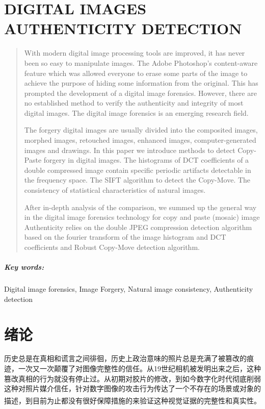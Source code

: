 \documentclass[a4paper, 10pt, notitlepage]{report}
\newcommand{\sihao}{\fontsize{14pt}{\baselineskip}\selectfont}
\newcommand{\wuhao}{\fontsize{10.5pt}{\baselineskip}\selectfont}
\newcommand{\supercite}[1]{\textsuperscript{\cite{#1}}}
\begin{document}
\chapter*{DIGITAL IMAGES AUTHENTICITY DETECTION}
	\thispagestyle{myheadings}
	\renewcommand{\abstractname}{\sihao ABSTRACT}
	\begin{abstract}
	\wuhao
	\vspace{20pt}
	With modern digital image processing tools are improved, it has never been so easy to manipulate images. The Adobe Photoshop's content-aware feature which was allowed everyone to erase some parts of the image to achieve the purpose of hiding some information from the original. This has prompted the development of a digital image forensics. However, there are no established method to verify the authenticity and integrity of most digital images. The digital image forensics is an emerging research field.

	The forgery digital images are usually divided into the composited images, morphed images, retouched images, enhanced images, computer-generated images and drawings. In this paper we introduce methods to detect Copy-Paste forgery in digital images. The histograms of DCT coefficients of a double compressed image contain specific periodic artifacts detectable in the frequency space. The SIFT algorithm to detect the Copy-Move. The consistency of statistical characteristics of natural images.

	 After in-depth analysis of the comparison, we summed up the general way in the digital image forensics technology for copy and paste (mosaic) image Authenticity relies on the double JPEG compression detection algorithm based on the fourier transform of the image histogram and DCT coefficients  and Robust Copy-Move detection algorithm.

	\end{abstract}

	\vspace{20pt}
	\paragraph{Key words:}
	Digital image forensics, Image Forgery, Natural image consistency, Authenticity detection


\tableofcontents \thispagestyle{myheadings}


\chapter{绪论}
	\setcounter{page}{1}
	历史总是在真相和谎言之间徘徊，历史上政治意味的照片总是充满了被篡改的痕迹，一次又一次颠覆了对图像完整性的信任。从19世纪相机被发明出来之后，这种篡改真相的行为就没有停止过。从初期对胶片的修改，到如今数字化时代彻底削弱这种对照片媒介信任，针对数字图像的攻击行为传达了一个不存在的场景或对象的描述，到目前为止都没有很好保障措施的来验证这种视觉证据的完整性和真实性\supercite{overview01}。
\end{document}
